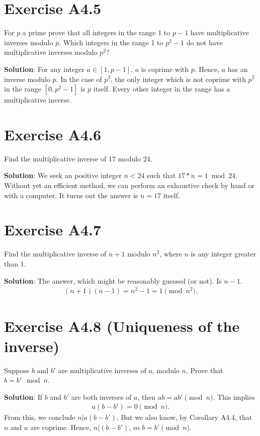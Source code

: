 \documentclass{book}
\begin{document}
\section*{Exercise A4.5}
    For $p$ a prime prove that all integers in the range 1 to $p-1$ have multiplicative inverses modulo $p$. Which integers in the range 1 to $p^2-1$ do not have multiplicative inverses modulo $p^2$?
    
    \textbf{Solution}: For any integer $a\in [1,p-1]$, $a$ is coprime with $p$. Hence, $a$ has an inverse modulo $p$. In the case of $p^2$, the only integer which is not coprime with $p^2$ in the range $[0,p^2-1]$ is $p$ itself. Every other integer in the range has a multiplicative inverse. 

\section*{Exercise A4.6}
    Find the multiplicative inverse of 17 modulo 24.
    
    \textbf{Solution}: We seek an positive integer $n<24$ such that $17 * n = 1 \bmod 24$. Without yet an efficient method, we can perform an exhaustive check by hand or with a computer. It turns out the answer is $n=17$ itself. 

\section*{Exercise A4.7}
    Find the multiplicative inverse of $n+1$ modulo $n^2$, where $n$ is any integer greater than 1.
    
    \textbf{Solution}: The answer, which might be reasonably guessed (or not). Is $n-1$.
    \begin{align}
        (n+1)(n-1) = n^2 - 1 = 1 \pmod n^2.
    \end{align}

\section*{Exercise A4.8 (Uniqueness of the inverse)}
    Suppose $b$ and $b'$ are multiplicative inverses of $a$, modulo $n$. Prove that $b=b' \mod n$.
    
    \textbf{Solution}: If $b$ and $b'$ are both inverses of $a$, then $ab = ab' \pmod n$. This implies
    \begin{align}
        a(b-b') = 0 \pmod n.
    \end{align}
    From this, we conclude $n|a(b-b')$. But we also know, by Corollary A4.4, that $n$ and $a$ are coprime. Hence, $n|(b-b')$, so $b=b' \pmod{n}$.
\end{document}
